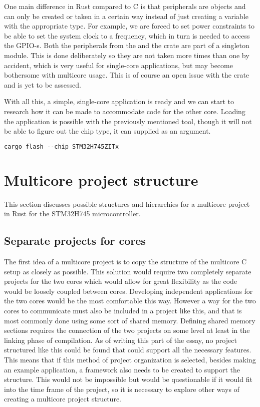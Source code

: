 One main difference in Rust compared to C is that peripherals are objects and can only be created or taken in a certain way instead of just creating a variable with the appropriate type. For example, we are forced to set power constraints to be able to set the system clock to a frequency, which in turn is needed to access the GPIO-s. Both the peripherals from the  and the  crate are part of a singleton module. This is done deliberately so they are not taken more times than one by accident, which is very useful for single-core applications, but may become bothersome with multicore usage. This is of course an open issue with the  crate and is yet to be assessed. \cite{MulticorePeripherals}

With all this, a simple, single-core application is ready and we can start to research how it can be made to accommodate code for the other core. Loading the application is possible with the previously mentioned  tool, though it will not be able to figure out the chip type, it can supplied as an argument.

\begin{lstlisting}[language=C,frame=single,float=!ht,label={lst:cargo-flash-1},caption={Flashing the Image with Cargo Flash}]
    cargo flash --chip STM32H745ZITx
\end{lstlisting}

\section{Multicore project structure}

This section discusses possible structures and hierarchies for a multicore project in Rust for the STM32H745 microcontroller.

\subsection{Separate projects for cores}

The first idea of a multicore project is to copy the structure of the multicore C setup as closely as possible. This solution would require two completely separate projects for the two cores which would allow for great flexibility as the code would be loosely coupled between cores. Developing independent applications for the two cores would be the most comfortable this way. However a way for the two cores to communicate must also be included in a project like this, and that is most commonly done using some sort of shared memory. Defining shared memory sections requires the connection of the two projects on some level at least in the linking phase of compilation. As of writing this part of the essay, no project structured like this could be found that could support all the necessary features. This means that if this method of project organization is selected, besides making an example application, a framework also needs to be created to support the structure. This would not be impossible but would be questionable if it would fit into the time frame of the project, so it is necessary to explore other ways of creating a multicore project structure.

